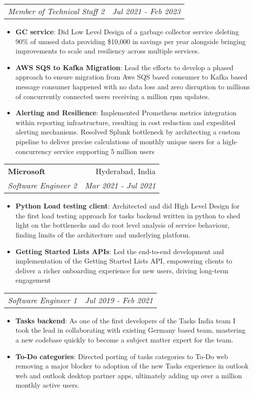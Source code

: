 \documentclass[letterpaper,11pt]{article}
\makeatletter
\newcommand{\resumeItem}[2]{
  \item\small{
    \textbf{#1}{: #2 \vspace{-2pt}}
  }
}
\newcommand{\resumeSubheading}[4]{
  \vspace{-1pt}\item
    \begin{tabular*}{0.97\textwidth}[t]{l@{\extracolsep{\fill}}r}
      \textbf{#1} & #2 \\
      \textit{\small#3} & \textit{\small #4} \\
    \end{tabular*}\vspace{-5pt}
}
\newcommand{\resumeSubSubheading}[2]{
    \begin{tabular*}{0.97\textwidth}{l@{\extracolsep{\fill}}r}
      \textit{\small#1} & \textit{\small #2} \\
    \end{tabular*}\vspace{-5pt}
}
\newcommand{\resumeItemListStart}{\begin{itemize}}
\newcommand{\resumeItemListEnd}{\end{itemize}\vspace{-5pt}}
\makeatother
\begin{document}
    \resumeSubSubheading
    {Member of Technical Staff 2}{Jul 2021 - Feb 2023}
      \resumeItemListStart
        \resumeItem{GC service}
          {Did Low Level Design of a garbage collector service deleting 90\% of unused data providing \$10,000 in savings per year alongside bringing improvements to scale and resiliency across multiple services.}
		    \resumeItem{AWS SQS to Kafka Migration}
          {Lead the efforts to develop a phased approach to ensure migration from Aws SQS based consumer to Kafka based message consumer happened with no data loss and zero disruption to millions of concurrently connected users receiving a million rpm updates.}
        \resumeItem{Alerting and Resilience}
          {Implemented Prometheus metrics integration within reporting infrastructure, resulting in cost reduction and expedited alerting mechanisms. Resolved Splunk bottleneck by architecting a custom pipeline to deliver precise calculations of monthly unique users for a high-concurrency service supporting 5 million users }
     \resumeItemListEnd


    \resumeSubheading
      {Microsoft}{Hyderabad, India}
      {Software Engineer 2}{Mar 2021 - Jul 2021}
      \resumeItemListStart
        \resumeItem{Python Load testing client}
          {Architected and did High Level Design for the first load testing approach for tasks backend written in python to shed light on the bottlenecks and do root level analysis of service behaviour, finding limits of the architecture and underlying platform.}
        \resumeItem{Getting Started Lists APIs}
          {Led the end-to-end development and implementation of the Getting Started Lists API, empowering clients to deliver a richer onboarding experience for new users, driving long-term engagement}
      \resumeItemListEnd

	  \resumeSubSubheading
		{Software Engineer 1}{Jul 2019 - Feb 2021}
		\resumeItemListStart
			\resumeItem{Tasks backend}
			{As one of the first developers of the Tasks India team I took the lead in collaborating with existing Germany based team, mastering a new codebase quickly to become a subject matter expert for the team.}
			\resumeItem{To-Do categories}
			{Directed porting of tasks categories to To-Do web removing a major blocker to adoption of the new Tasks experience in outlook web and outlook desktop partner apps, ultimately adding up over a million monthly active users.}
		\resumeItemListEnd
\end{document}
